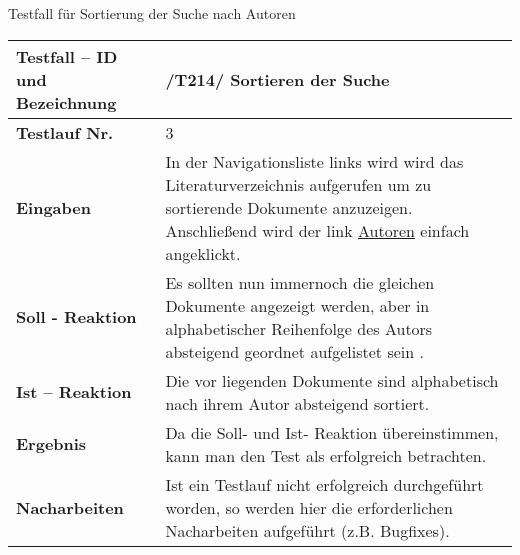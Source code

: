 Testfall für Sortierung der Suche nach Autoren\\ 
\begin{longtable}{|p{5cm}|p{10cm}|}
\hline
\textbf{Testfall -- ID und Bezeichnung} & \textnormal{/T214/ Sortieren der Suche} \\
\hline
\textbf{Testlauf Nr.} & \textnormal{3} \\
\hline
\textbf{Eingaben} & \textnormal{In der Navigationsliste links wird wird das Literaturverzeichnis aufgerufen um zu sortierende Dokumente anzuzeigen. Anschließend wird der link \uline{Autoren} einfach angeklickt.} \\
\hline
\textbf{Soll - Reaktion} & \textnormal{Es sollten nun immernoch die gleichen Dokumente angezeigt werden, aber in alphabetischer Reihenfolge des Autors absteigend geordnet aufgelistet sein .} \\
\hline
\textbf{Ist -- Reaktion} & \textnormal{Die vor liegenden Dokumente sind alphabetisch nach ihrem Autor absteigend sortiert.} \\
\hline
\textbf{Ergebnis} & \textnormal{Da die Soll- und Ist- Reaktion übereinstimmen, kann man den Test als erfolgreich betrachten.} \\
\hline
\textbf{Nacharbeiten } & \textnormal{Ist ein Testlauf nicht erfolgreich
durchgef\"uhrt worden, so werden hier die erforderlichen Nacharbeiten aufgef\"uhrt
(z.B. Bugfixes).} \\
\hline
 \end{longtable}
